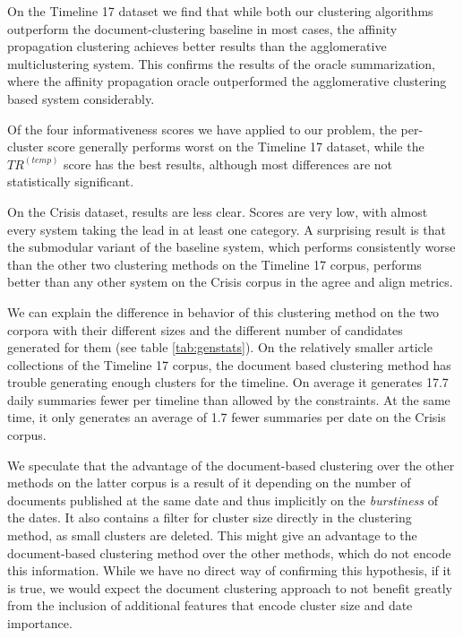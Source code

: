 \documentclass[a4paper,BCOR=10mm]{report}
\numberwithin{lemma}{chapter}
\numberwithin{definition}{chapter}
\begin{document}
On the Timeline 17 dataset we find that while both our clustering algorithms outperform the document-clustering baseline in most cases, the affinity propagation clustering achieves better results than the agglomerative multiclustering system. This confirms the results of the oracle summarization, where the affinity propagation oracle outperformed the agglomerative clustering based system considerably.

Of the four informativeness scores we have applied to our problem, the per-cluster score generally performs worst on the Timeline 17 dataset, while the $TR^{(temp)}$ score has the best results, although most differences are not statistically significant.

On the Crisis dataset, results are less clear.
Scores are very low, with almost every system taking the lead in at least one category.
A surprising result is that the submodular variant of the baseline system, which performs consistently worse than the other two clustering methods on the Timeline 17 corpus, performs better than any other system on the Crisis corpus in the agree and align metrics.

We can explain the difference in behavior of this clustering method on the two corpora with their different sizes and the different number of candidates generated for them (see table \ref{tab:genstats}).
On the relatively smaller article collections of the Timeline 17 corpus, the document based clustering method has trouble generating enough clusters for the timeline.
On average it generates 17.7 daily summaries fewer per timeline than allowed by the constraints. At the same time, it only generates an average of 1.7 fewer summaries per date on the Crisis corpus.

We speculate that the advantage of the document-based clustering over the other methods on the latter corpus is a result of it depending on the number of documents published at the same date and thus implicitly on the \textit{burstiness} of the dates. It also contains a filter for cluster size directly in the clustering method, as small clusters are deleted. This might give an advantage to the document-based clustering method over the other methods, which do not encode this information.
While we have no direct way of confirming this hypothesis, if it is true, we would expect the document clustering approach to not benefit greatly from the inclusion of additional features that encode cluster size and date importance.


\end{document}
